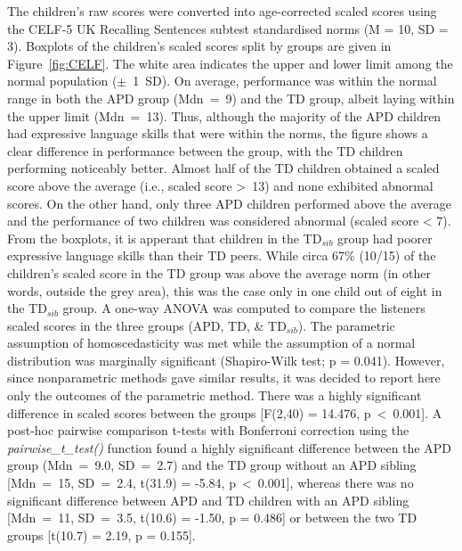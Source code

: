 \documentclass[a4paper, twoside]{templates/ociamthesis}
\begin{document}
The children's raw scores were converted into age-corrected scaled scores using the CELF-5 UK Recalling Sentences subtest standardised norms (M = 10, SD = 3). Boxplots of the children's scaled scores split by groups are given in Figure~\ref{fig:CELF}. The white area indicates the upper and lower limit among the normal population (\(\pm\)~1~SD). On average, performance was within the normal range in both the APD group (Mdn~=~9) and the TD group, albeit laying within the upper limit (Mdn~=~13). Thus, although the majority of the APD children had expressive language skills that were within the norms, the figure shows a clear difference in performance between the group, with the TD children performing noticeably better. Almost half of the TD children obtained a scaled score above the average (i.e., scaled score \textgreater~13) and none exhibited abnormal scores. On the other hand, only three APD children performed above the average and the performance of two children was considered abnormal (scaled score \textless{} 7).\\

From the boxplots, it is apperant that children in the TD\(_{sib}\) group had poorer expressive language skills than their TD peers. While circa 67\% (10/15) of the children's scaled score in the TD group was above the average norm (in other words, outside the grey area), this was the case only in one child out of eight in the TD\(_{sib}\) group. A one-way ANOVA was computed to compare the listeners scaled scores in the three groups (APD, TD, \& TD\(_{sib}\)). The parametric assumption of homoscedasticity was met while the assumption of a normal distribution was marginally significant (Shapiro-Wilk test; p = 0.041). However, since nonparametric methods gave similar results, it was decided to report here only the outcomes of the parametric method. There was a highly significant difference in scaled scores between the groups {[}F(2,40) = 14.476, p~\textless~0.001{]}. A post-hoc pairwise comparison t-tests with Bonferroni correction using the \emph{pairwise\_t\_test()} function \autocite[rstatix package;][]{rstatixPackageR} found a highly significant difference between the APD group (Mdn~=~9.0, SD~=~2.7) and the TD group without an APD sibling {[}Mdn~=~15, SD~=~2.4, t(31.9) = -5.84, p~\textless~0.001{]}, whereas there was no significant difference between APD and TD children with an APD sibling {[}Mdn~=~11, SD~=~3.5, t(10.6) = -1.50, p = 0.486{]} or between the two TD groups {[}t(10.7) = 2.19, p = 0.155{]}.\\
\end{document}
